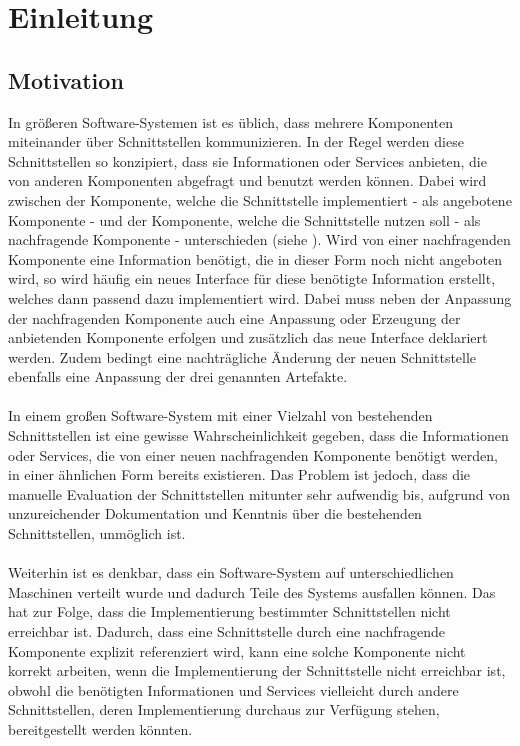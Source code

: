 \chapter{Einleitung}
\section{Motivation}
In größeren Software-Systemen ist es üblich, dass mehrere Komponenten miteinander über Schnittstellen kommunizieren. In der Regel werden diese Schnittstellen so konzipiert, dass sie Informationen oder Services anbieten, die von anderen Komponenten abgefragt und benutzt werden können. Dabei wird zwischen der Komponente, welche die Schnittstelle implementiert - als angebotene Komponente - und der Komponente, welche die Schnittstelle nutzen soll - als nachfragende Komponente - unterschieden (siehe ). 
\noindent
Wird von einer nachfragenden Komponente eine Information benötigt, die in dieser Form noch nicht angeboten wird, so wird häufig ein neues Interface für diese benötigte Information erstellt, welches dann passend dazu implementiert wird. Dabei muss neben der Anpassung der nachfragenden Komponente auch eine Anpassung oder Erzeugung der anbietenden Komponente erfolgen und zusätzlich das neue Interface deklariert werden. Zudem bedingt eine nachträgliche Änderung der neuen Schnittstelle ebenfalls eine Anpassung der drei genannten Artefakte.\\\\
In einem großen Software-System mit einer Vielzahl von bestehenden Schnittstellen ist eine gewisse Wahrscheinlichkeit gegeben, dass die Informationen oder Services, die von einer neuen nachfragenden Komponente benötigt werden, in einer ähnlichen Form bereits existieren. Das Problem ist jedoch, dass die manuelle Evaluation der Schnittstellen mitunter sehr aufwendig bis, aufgrund von unzureichender Dokumentation und Kenntnis über die bestehenden Schnittstellen, unmöglich ist.
\\\\
Weiterhin ist es denkbar, dass ein Software-System auf unterschiedlichen Maschinen verteilt wurde und dadurch Teile des Systems ausfallen können. Das hat zur Folge, dass die Implementierung bestimmter Schnittstellen nicht erreichbar ist. Dadurch, dass eine Schnittstelle durch eine nachfragende Komponente explizit referenziert wird, kann eine solche Komponente nicht korrekt arbeiten, wenn die Implementierung der Schnittstelle nicht erreichbar ist, obwohl die benötigten Informationen und Services vielleicht durch andere Schnittstellen, deren Implementierung durchaus zur Verfügung stehen, bereitgestellt werden könnten.
